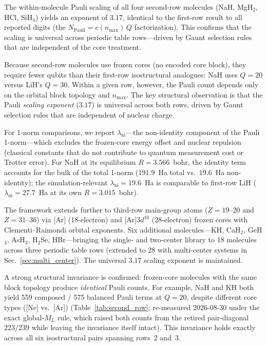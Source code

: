 \documentclass[aps,pra,twocolumn,superscriptaddress,longbibliography]{revtex4-2}
\begin{document}
The within-molecule Pauli scaling of all four second-row molecules
(NaH, MgH$_2$, HCl, SiH$_4$) yields an exponent of $3.17$,
identical to the first-row result to all reported digits (the
$N_{\mathrm{Pauli}} = c(n_{\max})\,Q$ factorization).
This confirms that the scaling is universal across
periodic table rows---driven by Gaunt selection rules that are
independent of the core treatment.

Because second-row molecules use frozen cores (no encoded core block),
they require fewer qubits than their first-row isostructural
analogues: NaH uses $Q = 20$ versus LiH's $Q = 30$.  Within a
given row, however, the Pauli count depends only on the orbital
block topology and $n_{\max}$.  The key structural observation is
that the Pauli \emph{scaling exponent} ($3.17$) is universal
across both rows, driven by Gaunt selection rules that are
independent of nuclear charge.

For 1-norm comparisons, we report
$\lambda_{\text{ni}}$---the non-identity component of the Pauli
1-norm---which excludes the frozen-core energy offset and nuclear
repulsion (classical constants that do not contribute to quantum
measurement cost or Trotter error).  For NaH at its equilibrium
$R = 3.566$~bohr, the identity term
accounts for the bulk of the total 1-norm ($191.9$~Ha total vs.\
$19.6$~Ha non-identity); the simulation-relevant
$\lambda_{\text{ni}} = 19.6$~Ha is comparable
to first-row LiH ($\lambda_{\text{ni}} = 27.7$~Ha at its own
$R = 3.015$~bohr).

The framework extends further to third-row main-group atoms
($Z = 19$--20 and $Z = 31$--36) via [Ar] (18-electron) and
[Ar]3$d^{10}$ (28-electron) frozen cores with Clementi--Raimondi
orbital exponents.  Six additional molecules---KH, CaH$_2$, GeH$_4$,
AsH$_3$, H$_2$Se, HBr---bringing the single- and two-center library
to 18 molecules across three periodic table rows (extended to
28 with multi-center systems in Sec.~\ref{sec:multi_center}).  The universal
$3.17$ scaling exponent is maintained.

A strong structural invariance is confirmed: frozen-core molecules
with the same block topology produce \emph{identical} Pauli counts.
For example, NaH and KH both yield 559 composed / 575 balanced
Pauli terms at $Q = 20$, despite different core types ([Ne] vs.\ [Ar])
(Table~\ref{tab:second_row}; re-measured 2026-08-30 under the exact
global-$M_L$ rule, which raised both counts from the retired
pair-diagonal $223/239$ while leaving the invariance itself intact).
This invariance holds exactly across all six isostructural pairs
spanning rows~2 and~3.
\end{document}
